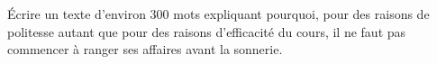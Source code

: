 
\begin{exercice}\label{exosmath-0427}

    Écrire un texte d'environ 300 mots expliquant pourquoi, pour des raisons de politesse autant que pour des raisons d'efficacité du cours, il ne faut pas commencer à ranger ses affaires avant la sonnerie.

\end{exercice}
